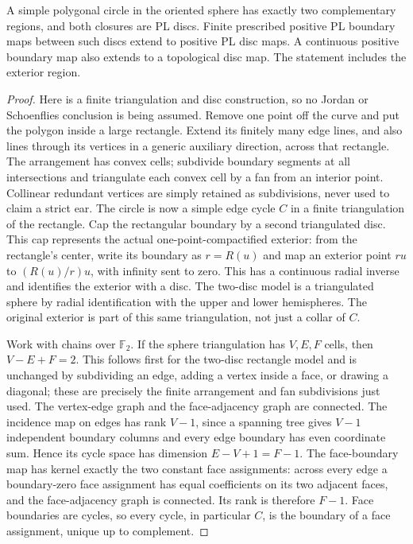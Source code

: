 \begin{lemma}
\label{lem:gauss-two-discs}\leanok
A simple polygonal circle in the oriented sphere has exactly two
complementary regions, and both closures are PL discs. Finite prescribed
positive PL boundary maps between such discs extend to positive PL disc
maps. A continuous positive boundary map also extends to a topological
disc map. The statement includes the exterior region.

\end{lemma}
\begin{proof}\leanok
Here is a finite triangulation and disc construction, so no Jordan or
Schoenflies conclusion is being assumed. Remove one point off the curve
and put the polygon inside a large rectangle. Extend its finitely many
edge lines, and also lines through its vertices in a generic auxiliary
direction, across that rectangle. The arrangement has convex cells;
subdivide boundary segments at all intersections and triangulate each
convex cell by a fan from an interior point. Collinear redundant vertices
are simply retained as subdivisions, never used to claim a strict ear.
The circle is now a simple edge cycle $C$ in a finite triangulation of
the rectangle. Cap the rectangular boundary by a second triangulated disc.
This cap represents the actual one-point-compactified exterior: from
the rectangle's center, write its boundary as $r=R(u)$ and map an
exterior point $ru$ to $(R(u)/r)u$, with infinity sent to zero.
This has a continuous radial inverse and identifies the exterior with a
disc. The two-disc model is a triangulated sphere by radial identification
with the upper and lower hemispheres. The original exterior is part of this same
triangulation, not just a collar of $C$.

Work with chains over $\mathbb F_2$. If the sphere triangulation has
$V,E,F$ cells, then $V-E+F=2$. This follows first for the two-disc
rectangle model and is unchanged by subdividing an edge, adding a vertex
inside a face, or drawing a diagonal; these are precisely the finite
arrangement and fan subdivisions just used. The vertex-edge graph and
the face-adjacency graph are connected. The incidence map on edges has
rank $V-1$, since a spanning tree gives $V-1$ independent boundary
columns and every edge boundary has even coordinate sum. Hence its
cycle space has dimension $E-V+1=F-1$. The face-boundary map has
kernel exactly the two constant face assignments: across every edge a
boundary-zero face assignment has equal coefficients on its two adjacent
faces, and the face-adjacency graph is connected. Its rank is therefore
$F-1$. Face boundaries are cycles, so every cycle, in particular $C$,
is the boundary of a face assignment, unique up to complement.


\end{proof}
